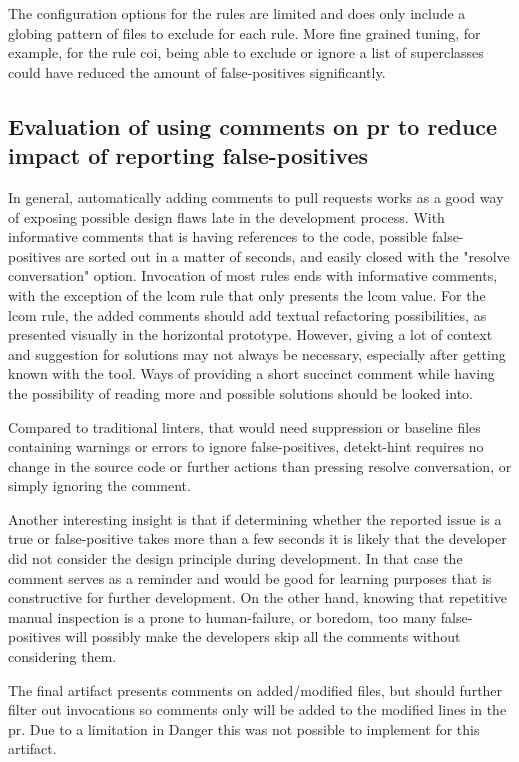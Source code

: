 \documentclass{report}
\begin{document}
The configuration options for the rules are limited and does only include a globing pattern of files to exclude for each rule. More fine grained tuning, for example, for the rule \gls{coi}, being able to exclude or ignore a list of superclasses could have reduced the amount of false-positives significantly.  


\subsection*{Evaluation of using comments on \gls{pr} to reduce impact of reporting false-positives}
\label{evaluation-comments}
In general, automatically adding comments to pull requests works as a good way of exposing possible design flaws late in the development process. With informative comments that is having references to the code, possible false-positives are sorted out in a matter of seconds, and easily closed with the "resolve conversation" option. Invocation of most rules ends with informative comments, with the exception of the \gls{lcom} rule that only presents the \gls{lcom} value. For the \gls{lcom} rule, the added comments should add textual refactoring possibilities, as presented visually in the horizontal prototype. However, giving a lot of context and suggestion for solutions may not always be necessary, especially after getting known with the tool. Ways of providing a short succinct comment while having the possibility of reading more and possible solutions should be looked into.

Compared to traditional linters, that would need suppression or baseline files containing warnings or errors to ignore false-positives, detekt-hint requires no change in the source code or further actions than pressing resolve conversation, or simply ignoring the comment.  

Another interesting insight is that if determining whether the reported issue is a true or false-positive takes more than a few seconds it is likely that the developer did not consider the design principle during development. In that case the comment serves as a reminder and would be good for learning purposes that is constructive for further development. On the other hand, knowing that repetitive manual inspection is a prone to human-failure, or boredom, too many false-positives will possibly make the developers skip all the comments without considering them. 

The final artifact presents comments on added/modified files, but should further filter out invocations so comments only will be added to the modified lines in the \gls{pr}. Due to a limitation in Danger this was not possible to implement for this artifact.
\end{document}
